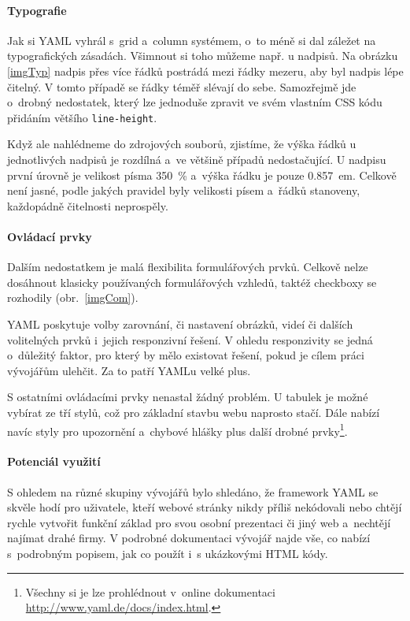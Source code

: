 \documentclass[thesis=B,czech]{FITthesis}[2012/06/26]
\begin{document}
\paragraph{Typografie}

Jak si YAML vyhrál s~grid a~column systémem, o~to méně si dal záležet na typografických zásadách. Všimnout si toho můžeme např. u nadpisů. Na obrázku \ref{imgTyp} nadpis přes více řádků postrádá mezi řádky mezeru, aby byl nadpis lépe čitelný. V tomto případě se řádky téměř slévají do sebe. Samozřejmě jde o~drobný nedostatek, který lze jednoduše zpravit ve svém vlastním CSS kódu přidáním většího \verb#line-height#.

Když ale nahlédneme do zdrojových souborů, zjistíme, že výška řádků u jednotlivých nadpisů je rozdílná a~ve většině případů nedostačující. U nadpisu první úrovně je velikost písma 350~\% a~výška řádku je pouze 0.857~em. Celkově není jasné, podle jakých pravidel byly velikosti písem a~řádků stanoveny, každopádně čitelnosti neprospěly.

\paragraph{Ovládací prvky}

Dalším nedostatkem je malá flexibilita formulářových prvků. Celkově nelze dosáhnout klasicky používaných formulářových vzhledů, taktéž checkboxy se rozhodily (obr.~\ref{imgCom}). 

YAML poskytuje volby zarovnání, či nastavení obrázků, videí či dalších volitelných prvků i~jejich responzivní řešení. V ohledu responzivity se jedná o~důležitý faktor, pro který by mělo existovat řešení, pokud je cílem práci vývojářům ulehčit. Za to patří YAMLu velké plus.


S ostatními ovládacími prvky nenastal žádný problém. U tabulek  je možné vybírat ze tří stylů, což pro základní stavbu webu naprosto stačí. Dále nabízí navíc styly pro upozornění a~chybové hlášky plus další drobné prvky\footnote{Všechny si je lze prohlédnout v~online dokumentaci \url{http://www.yaml.de/docs/index.html}.}. 

\paragraph{Potenciál využití}

S ohledem na různé skupiny vývojářů bylo shledáno, že framework YAML se skvěle hodí pro uživatele, kteří webové stránky nikdy příliš nekódovali nebo chtějí rychle vytvořit funkční základ pro svou osobní prezentaci či jiný web a~nechtějí najímat drahé firmy. V podrobné dokumentaci vývojář najde vše, co nabízí s~podrobným popisem, jak co použít i~s ukázkovými HTML kódy.
\end{document}
